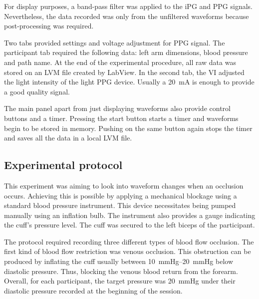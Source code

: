 For display purposes, a band-pass filter was applied to the iPG and PPG signals. Nevertheless, the data recorded  was only from the unfiltered waveforms because post-processing was required.  


Two tabs provided settings and voltage adjustment for PPG signal. The participant tab required the following data: left arm dimensions, blood pressure and path name. At the end of the experimental procedure, all raw data was stored on an LVM file created by LabView. In the second tab, the VI adjusted the light intensity of the light PPG device. Usually a \SI{20}{\milli\ampere} is enough to provide a good quality signal. 

The main panel apart from just displaying waveforms also provide control buttons and a timer.  Pressing the start button starts a timer and waveforms begin to be stored in memory. Pushing on the same button again stops the timer and saves all the data in a local LVM file. 


\subsection{Experimental protocol}
\label{section procedure 1.3}

This experiment was aiming to look into waveform changes when an occlusion occurs. Achieving this is possible by applying a mechanical blockage using a standard blood pressure instrument. This device necessitates being pumped manually using an inflation bulb. The instrument also provides a gauge indicating the cuff's pressure level. The cuff was secured to the left biceps of the participant. 

The protocol required recording three different types of blood flow occlusion. The first kind of blood flow restriction was venous occlusion.  This obstruction can be produced by inflating the cuff usually between \SIrange{10}{20}{\mmHg} below diastolic pressure. Thus, blocking the venous blood return from the forearm.  Overall, for each participant, the target pressure was \SI{20}{\mmHg} under their diastolic pressure recorded at the beginning of the session. 

